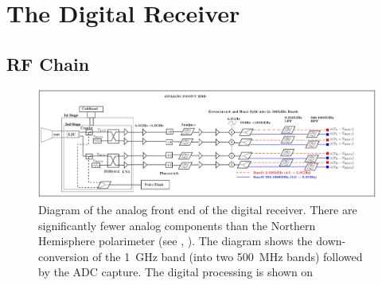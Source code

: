 \section{The Digital Receiver}
\subsection{RF Chain}
\label{sec:digitalRX}

\begin{figure}[ht]
 \centering
 \includegraphics[width=\textwidth,height=0.4\textheight]{images/receiver_schematics/rfNew.jpg} %
 \caption{Diagram of the analog front end of the digital receiver. There are significantly fewer analog components than the Northern Hemisphere polarimeter (see , ). The diagram shows the down-conversion of the 1~GHz band (into two 500~MHz bands) followed by the ADC capture. The digital processing is shown on   }
 \label{fig:digital_receiver}
\end{figure}

